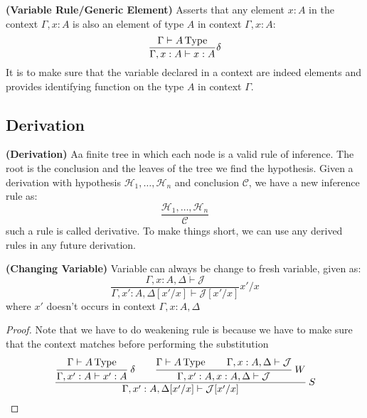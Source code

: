 \begin{definition}{\textbf{(Variable Rule/Generic Element)}}
    Asserts that any element $x:A$ in the context $\Gamma,x:A$ is also an element of type $A$ in context $\Gamma,x:A$:
    \begin{equation*}
        \frac{\Gamma\vdash A\operatorname{Type} }{\Gamma,x:A\vdash x:A}\delta
    \end{equation*}
    It is to make sure that the variable declared in a context are indeed elements and provides identifying function on the type $A$ in context $\Gamma$.
\end{definition}

\subsection{Derivation}

\begin{definition}{\textbf{(Derivation)}}
    Aa finite tree in which each node is a valid rule of inference. The root is the conclusion and the leaves of the tree we find the hypothesis. Given a derivation with hypothesis $\mathcal{H}_1,\dots,\mathcal{H}_n$ and conclusion $\mathcal{C}$, we have a new inference rule as:
    \begin{equation*}
        \frac{\mathcal{H}_1,\dots,\mathcal{H}_n}{\mathcal{C}}
    \end{equation*}
    such a rule is called derivative. To make things short, we can use any derived rules in any future derivation.
\end{definition}

\begin{lemma}{\textbf{(Changing Variable)}}
    Variable can always be change to fresh variable, given as:
    \begin{equation*}
        \frac{\Gamma,x:A,\Delta\vdash\mathcal{J}}{\Gamma,x':A,\Delta[x'/x]\vdash\mathcal{J}[x'/x]}x'/x
    \end{equation*}
    where $x'$ doesn't occurs in context $\Gamma,x:A,\Delta$
\end{lemma}
\begin{dem}
\begin{proof}
    Note that we have to do weakening rule is because we have to make sure that the context matches before performing the substitution
    \begin{equation*}
        \cfrac{\cfrac{\Gamma\vdash A\type }{\Gamma, x':A\vdash x':A}\ \delta \qquad \cfrac{\Gamma\vdash A\type \qquad \Gamma,x:A,\Delta\vdash\mathcal{J}}{\Gamma,x':A,x:A,\Delta\vdash\mathcal{J}}\ W}{\Gamma,x':A,\Delta[x'/x]\vdash\mathcal{J}[x'/x]}\ S
    \end{equation*}
\end{proof}
\end{dem}

